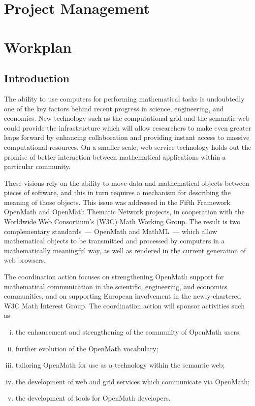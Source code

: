 \documentclass{euproposal}
\begin{document}
\chapter{Project Management}\label{cha:management}


\chapter{Workplan}\label{cha:workplan}



\section{Introduction}

The ability to use computers for performing mathematical tasks is
undoubtedly one of the key factors behind recent progress in science,
engineering, and economics.  New technology such as the computational
grid and the semantic web could provide the infrastructure which will
allow researchers to make even greater leaps forward by enhancing
collaboration and providing instant access to massive computational
resources.  On a smaller scale, web service technology holds out the
promise of better interaction between mathematical applications within
a particular community.

These visions rely on the ability to move data and mathematical
objects between pieces of software, and this in turn requires a
mechanism for describing the meaning of those objects.  This issue was
addressed in the Fifth Framework OpenMath and OpenMath Thematic
Network projects, in cooperation with the Worldwide Web Consortium's
(W3C) Math Working Group.  The result is two complementary
standards~--- OpenMath and MathML~--- which allow mathematical objects
to be transmitted and processed by computers in a mathematically
meaningful way, as well as rendered in the current generation of web
browsers.

The coordination action focuses on strengthening OpenMath support for
mathematical communication in the scientific, engineering, and
economics communities, and on supporting European involvement in the
newly-chartered W3C Math Interest Group.  The coordination action will
sponsor activities such as

\begin{enumerate}[(i)]
\item the enhancement and strengthening of the community of OpenMath
  users;
\item further evolution of the OpenMath vocabulary;
\item tailoring OpenMath for use as a technology within the semantic
  web;
\item the development of web and grid services which communicate via
  OpenMath;
\item the development of tools for OpenMath developers.
\end{enumerate}
\end{document}
